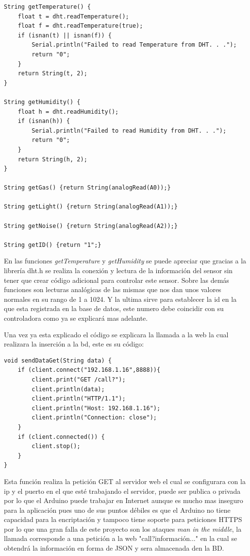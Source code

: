 \begin{lstlisting}
String getTemperature() {
	float t = dht.readTemperature();
	float f = dht.readTemperature(true);
	if (isnan(t) || isnan(f)) {
		Serial.println("Failed to read Temperature from DHT. . .");
		return "0";
	}
	return String(t, 2);
}

String getHumidity() {
	float h = dht.readHumidity();
	if (isnan(h)) {
		Serial.println("Failed to read Humidity from DHT. . .");
		return "0";
	}
	return String(h, 2);
}

String getGas() {return String(analogRead(A0));}

String getLight() {return String(analogRead(A1));}

String getNoise() {return String(analogRead(A2));}

String getID() {return "1";}
\end{lstlisting}

En las funciones \textit{getTemperature} y \textit{getHumidity} se puede apreciar que gracias a la librería dht.h se realiza la conexión y lectura de la información del sensor sin tener que crear código adicional para controlar este sensor. Sobre las demás funciones son lecturas analógicas de las mismas que nos dan unos valores normales en su rango de 1 a 1024. Y la ultima sirve para establecer la id en la que esta registrada en la base de datos, este numero debe coincidir con su controladora como ya se explicará mas adelante.

Una vez ya esta explicado el código se explicara la llamada a la web la cual realizara la inserción a la bd, este es su código:

\begin{lstlisting}[caption=Funcion de comunicacion con el servidor, label=comunicacion]
void sendDataGet(String data) {
	if (client.connect("192.168.1.16",8888)){
		client.print("GET /call?");
		client.println(data);
		client.println("HTTP/1.1");
		client.println("Host: 192.168.1.16");        
		client.println("Connection: close");
	}
	if (client.connected()) { 
		client.stop();
	}
}
\end{lstlisting}


Esta función realiza la petición GET al servidor web el cual se configurara con la ip y el puerto en el que esté trabajando el servidor, puede ser publica o privada por lo que el Arduino puede trabajar en Internet aunque es mucho mas inseguro para la aplicación pues uno de sus puntos débiles es que el Arduino no tiene capacidad para la encriptación y tampoco tiene soporte para peticiones HTTPS por lo que una gran falla de este proyecto son los ataques \textit{man in the middle}, la llamada corresponde a una petición a la web "call?información..." en la cual se obtendrá la información en forma de JSON y sera almacenada den la BD.


